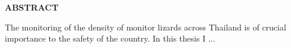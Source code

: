 
\begin{center}
    \large{\bf ABSTRACT}
\end{center}

The monitoring of the density of monitor lizards across Thailand is of crucial importance to the safety of the country. In this thesis I ...